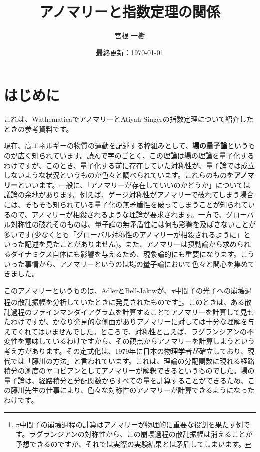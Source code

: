 \documentclass[unicode,a4paper,10pt]{ltjsarticle}
\begin{document}
\title{
  アノマリーと指数定理の関係
}
\author{
  宮根 一樹
}
\date{最終更新：\today}

\maketitle
\tableofcontents

\section{はじめに}

これは、WathematicaでアノマリーとAtiyah-Singerの指数定理について紹介したときの参考資料です。

現在、高エネルギーの物質の運動を記述する枠組みとして、\textbf{場の量子論}というものが広く知られています。読んで字のごとく、この理論は場の理論を量子化するわけですが、このとき、量子化する前に存在していた対称性が、量子論では成立しないような状況というものが色々と調べられています。これらのものを\textbf{アノマリー}といいます。一般に、「アノマリーが存在していいのかどうか」については議論の余地があります。例えば、ゲージ対称性がアノマリーで破れてしまう場合には、そもそも知られている量子化の無矛盾性を破ってしまうことが知られているので、アノマリーが相殺されるような理論が要求されます。一方で、グローバル対称性の破れそのものは、量子論の無矛盾性には何も影響を及ぼさないことが多いです(少なくとも「グローバル対称性のアノマリーが相殺されるように」といった記述を見たことがありません)。また、アノマリーは摂動論から求められるダイナミクス自体にも影響を与えるため、現象論的にも重要になります。こういった事情から、アノマリーというのは場の量子論において色々と関心を集めてきました。

このアノマリーというものは、Adler\cite{Adler:1969gk}とBell-Jakiw\cite{Bell:1969ts}が、$\pi$中間子の光子への崩壊過程の散乱振幅を分析していたときに発見されたものです\footnote{
  $\pi$中間子の崩壊過程の計算はアノマリーが物理的に重要な役割を果たす例です。ラグランジアンの対称性から、この崩壊過程の散乱振幅は消えることが予想できるのですが、それでは実際の実験結果とは矛盾してしまいます。
}。このときは、ある散乱過程のファインマンダイアグラムを計算することでアノマリーを計算して見せたわけですが、かなり発見的な側面がありアノマリーに対しては十分な理解を与えてくれてはいませんでした。ところで、対称性と言えば、ラグランジアンの不変性を意味しているわけですから、その観点からアノマリーを計算しようという考え方があります。その定式化は、1979年に日本の物理学者が確立しており、現代では「藤川の方法」と言われています\cite{Fujikawa:1979ay}。これは、理論の分配関数に現れる経路積分の測度のヤコビアンとしてアノマリーが解釈できるというものでした。場の量子論は、経路積分と分配関数からすべての量を計算することができるため、この藤川先生の仕事により、色々な対称性のアノマリーが計算できるようになったわけです。
\end{document}
